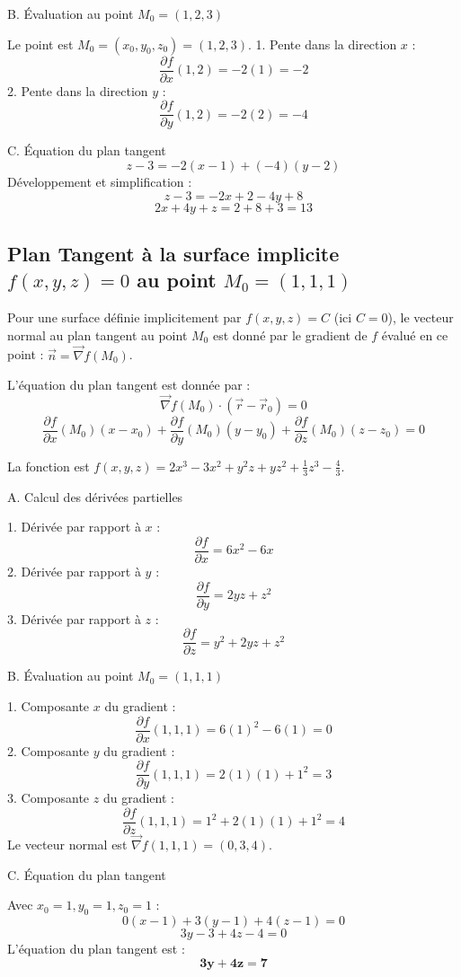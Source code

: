 \documentclass[french]{yLectureNote}
\renewcommand{\vec}{\overrightarrow}
\begin{document}
B. Évaluation au point $M_0 = (1, 2, 3)$

Le point est $M_0=(x_0,y_0,z_0)=(1,2,3)$.
1.  Pente dans la direction $x$ :
    $$
    \frac{\partial f}{\partial x}(1, 2) = -2(1) = -2
    $$
2.  Pente dans la direction $y$ :
    $$
    \frac{\partial f}{\partial y}(1, 2) = -2(2) = -4
    $$

C. Équation du plan tangent
$$
z - 3 = -2(x - 1) + (-4)(y - 2)
$$
Développement et simplification :
$$
z - 3 = -2x + 2 - 4y + 8
$$
$$
2x + 4y + z = 2 + 8 + 3 = 13
$$
\subsection{Plan Tangent à la surface implicite $f(x,y,z)=0$ au point $M_0=(1, 1, 1)$}

Pour une surface définie implicitement par $f(x,y,z)=C$ (ici $C=0$), le vecteur normal au plan tangent au point $M_0$ est donné par le gradient de $f$ évalué en ce point : $\vec{n} = \vec{\nabla}f(M_0)$.

L'équation du plan tangent est donnée par :
$$
\vec{\nabla}f(M_0) \cdot (\vec{r} - \vec{r}_0) = 0
$$
$$
\frac{\partial f}{\partial x}(M_0)(x - x_0) + \frac{\partial f}{\partial y}(M_0)(y - y_0) + \frac{\partial f}{\partial z}(M_0)(z - z_0) = 0
$$

La fonction est $f(x,y,z)=2x^{3}-3x^{2}+y^{2}z+yz^{2}+\frac{1}{3}z^{3}-\frac{4}{3}$.

 A. Calcul des dérivées partielles

1.  Dérivée par rapport à $x$ :
    $$
    \frac{\partial f}{\partial x} = 6x^2 - 6x
    $$
2.  Dérivée par rapport à $y$ :
    $$
    \frac{\partial f}{\partial y} = 2yz + z^2
    $$
3.  Dérivée par rapport à $z$ :
    $$
    \frac{\partial f}{\partial z} = y^2 + 2yz + z^2
    $$

 B. Évaluation au point $M_0 = (1, 1, 1)$

1.  Composante $x$ du gradient :
    $$
    \frac{\partial f}{\partial x}(1, 1, 1) = 6(1)^2 - 6(1) = 0
    $$
2.  Composante $y$ du gradient :
    $$
    \frac{\partial f}{\partial y}(1, 1, 1) = 2(1)(1) + 1^2 = 3
    $$
3.  Composante $z$ du gradient :
    $$
    \frac{\partial f}{\partial z}(1, 1, 1) = 1^2 + 2(1)(1) + 1^2 = 4
    $$
Le vecteur normal est $\vec{\nabla}f(1, 1, 1) = (0, 3, 4)$.

 C. Équation du plan tangent

Avec $x_0=1, y_0=1, z_0=1$ :
$$
0(x - 1) + 3(y - 1) + 4(z - 1) = 0
$$
$$
3y - 3 + 4z - 4 = 0
$$
L'équation du plan tangent est :
$$
\mathbf{3y + 4z = 7}
$$
\end{document}
